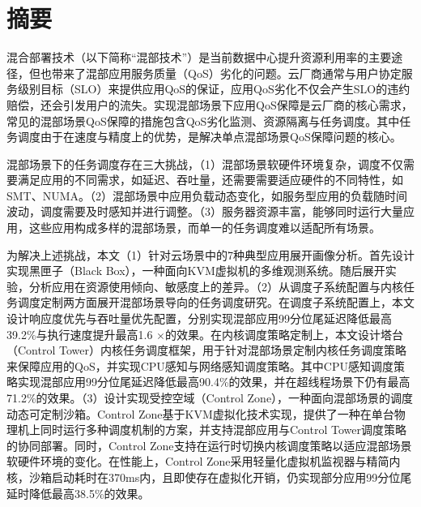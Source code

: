
\maketitle%
\MAKETITLE%
\makedeclaration%
\intobmk\chapter*{摘\quad 要}%
\setcounter{page}{1}%


混合部署技术（以下简称“混部技术”）是当前数据中心提升资源利用率的主要途径，但也带来了混部应用服务质量（QoS）劣化的问题。云厂商通常与用户协定服务级别目标（SLO）来提供应用QoS的保证，应用QoS劣化不仅会产生SLO的违约赔偿，还会引发用户的流失。实现混部场景下应用QoS保障是云厂商的核心需求，常见的混部场景QoS保障的措施包含QoS劣化监测、资源隔离与任务调度。其中任务调度由于在速度与精度上的优势，是解决单点混部场景QoS保障问题的核心。

混部场景下的任务调度存在三大挑战，（1）混部场景软硬件环境复杂，调度不仅需要满足应用的不同需求，如延迟、吞吐量，还需要需要适应硬件的不同特性，如SMT、NUMA。（2）混部场景中应用负载动态变化，如服务型应用的负载随时间波动，调度需要及时感知并进行调整。（3）服务器资源丰富，能够同时运行大量应用，这些应用构成多样的混部场景，而单一的任务调度难以适配所有场景。

为解决上述挑战，本文（1）针对云场景中的7种典型应用展开画像分析。首先设计实现黑匣子（Black Box），一种面向KVM虚拟机的多维观测系统。随后展开实验，分析应用在资源使用倾向、敏感度上的差异。（2）从调度子系统配置与内核任务调度定制两方面展开混部场景导向的任务调度研究。在调度子系统配置上，本文设计响应度优先与吞吐量优先配置，分别实现混部应用99分位尾延迟降低最高39.2\%与执行速度提升最高1.6 $\times$的效果。在内核调度策略定制上，本文设计塔台（Control Tower）内核任务调度框架，用于针对混部场景定制内核任务调度策略来保障应用的QoS，并实现CPU感知与网络感知调度策略。其中CPU感知调度策略实现混部应用99分位尾延迟降低最高90.4\%的效果，并在超线程场景下仍有最高71.2\%的效果。（3）设计实现受控空域（Control Zone），一种面向混部场景的调度动态可定制沙箱。Control Zone基于KVM虚拟化技术实现，提供了一种在单台物理机上同时运行多种调度机制的方案，并支持混部应用与Control Tower调度策略的协同部署。同时，Control Zone支持在运行时切换内核调度策略以适应混部场景软硬件环境的变化。在性能上，Control Zone采用轻量化虚拟机监视器与精简内核，沙箱启动耗时在370ms内，且即使存在虚拟化开销，仍实现部分应用99分位尾延时降低最高38.5\%的效果。

